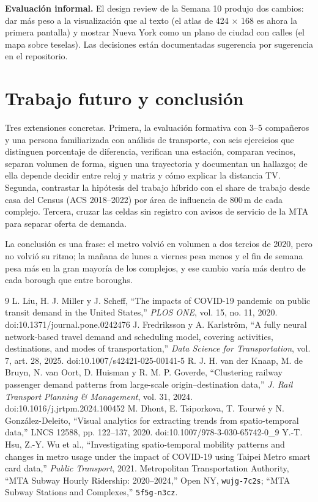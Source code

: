 \IfFileExists{IEEEtran.cls}{\documentclass[conference]{IEEEtran}}{\documentclass[10pt,twocolumn]{article}}
\begin{document}
\textbf{Evaluación informal.} El design review de la Semana 10 produjo dos cambios: dar más peso a la visualización que al texto (el atlas de 424 $\times$ 168 es ahora la primera pantalla) y mostrar Nueva York como un plano de ciudad con calles (el mapa sobre teselas). Las decisiones están documentadas sugerencia por sugerencia en el repositorio.

\section{Trabajo futuro y conclusión}

Tres extensiones concretas. Primera, la evaluación formativa con 3--5 compañeros y una persona familiarizada con análisis de transporte, con seis ejercicios que distinguen porcentaje de diferencia, verifican una estación, comparan vecinos, separan volumen de forma, siguen una trayectoria y documentan un hallazgo; de ella depende decidir entre reloj y matriz y cómo explicar la distancia TV. Segunda, contrastar la hipótesis del trabajo híbrido con el share de trabajo desde casa del Census (ACS 2018--2022) por área de influencia de 800\,m de cada complejo. Tercera, cruzar las celdas sin registro con avisos de servicio de la MTA para separar oferta de demanda.

La conclusión es una frase: el metro volvió en volumen a dos tercios de 2020, pero no volvió su ritmo; la mañana de lunes a viernes pesa menos y el fin de semana pesa más en la gran mayoría de los complejos, y ese cambio varía más dentro de cada borough que entre boroughs.

\begin{thebibliography}{9}
 L. Liu, H. J. Miller y J. Scheff, ``The impacts of COVID-19 pandemic on public transit demand in the United States,'' \emph{PLOS ONE}, vol. 15, no. 11, 2020. doi:10.1371/journal.pone.0242476
 J. Fredriksson y A. Karlström, ``A fully neural network-based travel demand and scheduling model, covering activities, destinations, and modes of transportation,'' \emph{Data Science for Transportation}, vol. 7, art. 28, 2025. doi:10.1007/s42421-025-00141-5
 R. J. H. van der Knaap, M. de Bruyn, N. van Oort, D. Huisman y R. M. P. Goverde, ``Clustering railway passenger demand patterns from large-scale origin--destination data,'' \emph{J. Rail Transport Planning \& Management}, vol. 31, 2024. doi:10.1016/j.jrtpm.2024.100452
 M. Dhont, E. Tsiporkova, T. Tourwé y N. González-Deleito, ``Visual analytics for extracting trends from spatio-temporal data,'' LNCS 12588, pp. 122--137, 2020. doi:10.1007/978-3-030-65742-0\_9
 Y.-T. Hsu, Z.-Y. Wu et al., ``Investigating spatio-temporal mobility patterns and changes in metro usage under the impact of COVID-19 using Taipei Metro smart card data,'' \emph{Public Transport}, 2021.
 Metropolitan Transportation Authority, ``MTA Subway Hourly Ridership: 2020--2024,'' Open NY, \texttt{wujg-7c2s}; ``MTA Subway Stations and Complexes,'' \texttt{5f5g-n3cz}.
\end{thebibliography}
\end{document}
